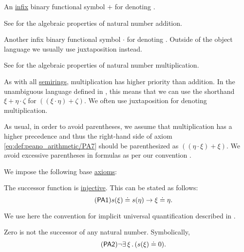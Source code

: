 \begin{definition}
\begin{thmenum}[series=def:peano_arithmetic]
     An \hyperref[rem:first_order_formula_conventions/infix]{infix} binary functional symbol \( + \) for denoting .

    See  for the algebraic properties of natural number addition.

     Another infix binary functional symbol \( \cdot \) for denoting . Outside of the object language we usually use juxtaposition instead.

    See  for the algebraic properties of natural number multiplication.

    As with all \hyperref[def:semiring]{semirings}, multiplication has higher priority than addition. In the unambiguous language defined in , this means that we can use the shorthand \( \xi + \eta \cdot \zeta \) for \( ((\xi \cdot \eta) + \zeta) \). We often use juxtaposition for denoting multiplication.
  \end{thmenum}

  As usual, in order to avoid parentheses, we assume that multiplication has a higher precedence and thus the right-hand side of axiom \eqref{eq:def:peano_arithmetic/PA7} should be parenthesized as \( ((\eta \cdot \xi) + \xi) \). We avoid excessive parentheses in formulas as per our convention .

  We impose the following base \hyperref[def:first_order_theory]{axioms}:
  \begin{thmenum}[resume=def:peano_arithmetic]
     The successor function is \hyperref[thm:function_invertibility_categorical/nonempty_injective]{injective}. This can be stated as follows:
    \begin{equation}\label{eq:def:peano_arithmetic/PA1}\tag{\logic{PA1}}
      s(\xi) \doteq s(\eta) \rightarrow \xi \doteq \eta.
    \end{equation}

    We use here the convention for implicit universal quantification described in .

     Zero is not the successor of any natural number. Symbolically,
    \begin{equation}\label{eq:def:peano_arithmetic/PA2}\tag{\logic{PA2}}
      \neg \qexists \xi (s(\xi) \doteq 0).
    \end{equation}


\end{thmenum}
\end{definition}
